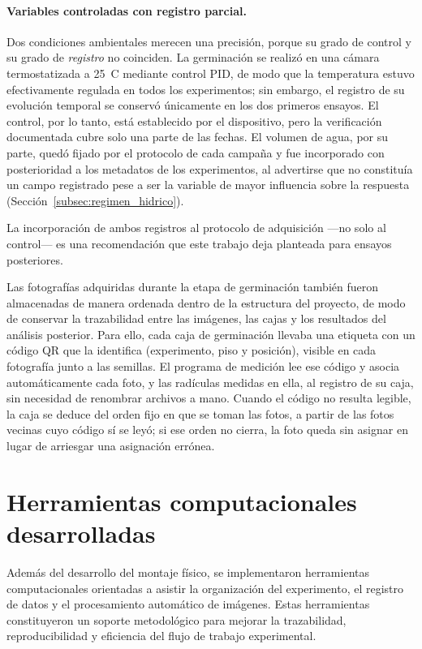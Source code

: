 \paragraph{Variables controladas con registro parcial.}

Dos condiciones ambientales merecen una precisión, porque su grado de control y su grado de \emph{registro} no coinciden. La germinación se realizó en una cámara termostatizada a 25~\textdegree C mediante control PID, de modo que la temperatura estuvo efectivamente regulada en todos los experimentos; sin embargo, el registro de su evolución temporal se conservó únicamente en los dos primeros ensayos. El control, por lo tanto, está establecido por el dispositivo, pero la verificación documentada cubre solo una parte de las fechas. El volumen de agua, por su parte, quedó fijado por el protocolo de cada campaña y fue incorporado con posterioridad a los metadatos de los experimentos, al advertirse que no constituía un campo registrado pese a ser la variable de mayor influencia sobre la respuesta (Sección~\ref{subsec:regimen_hidrico}).

La incorporación de ambos registros al protocolo de adquisición ---no solo al control--- es una recomendación que este trabajo deja planteada para ensayos posteriores.

Las fotografías adquiridas durante la etapa de germinación también fueron almacenadas de manera ordenada dentro de la estructura del proyecto, de modo de conservar la trazabilidad entre las imágenes, las cajas y los resultados del análisis posterior. Para ello, cada caja de germinación llevaba una etiqueta con un código QR que la identifica (experimento, piso y posición), visible en cada fotografía junto a las semillas. El programa de medición lee ese código y asocia automáticamente cada foto, y las radículas medidas en ella, al registro de su caja, sin necesidad de renombrar archivos a mano. Cuando el código no resulta legible, la caja se deduce del orden fijo en que se toman las fotos, a partir de las fotos vecinas cuyo código sí se leyó; si ese orden no cierra, la foto queda sin asignar en lugar de arriesgar una asignación errónea.

\section{Herramientas computacionales desarrolladas}

Además del desarrollo del montaje físico, se implementaron herramientas computacionales orientadas a asistir la organización del experimento, el registro de datos y el procesamiento automático de imágenes. Estas herramientas constituyeron un soporte metodológico para mejorar la trazabilidad, reproducibilidad y eficiencia del flujo de trabajo experimental.


